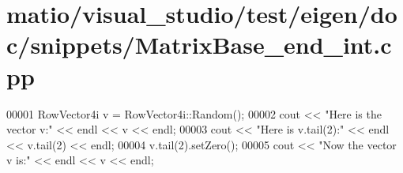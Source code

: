 \hypertarget{matio_2visual__studio_2test_2eigen_2doc_2snippets_2_matrix_base__end__int_8cpp_source}{}\section{matio/visual\+\_\+studio/test/eigen/doc/snippets/\+Matrix\+Base\+\_\+end\+\_\+int.cpp}
\label{matio_2visual__studio_2test_2eigen_2doc_2snippets_2_matrix_base__end__int_8cpp_source}

\begin{DoxyCode}
00001 RowVector4i v = RowVector4i::Random();
00002 cout << \textcolor{stringliteral}{"Here is the vector v:"} << endl << v << endl;
00003 cout << \textcolor{stringliteral}{"Here is v.tail(2):"} << endl << v.tail(2) << endl;
00004 v.tail(2).setZero();
00005 cout << \textcolor{stringliteral}{"Now the vector v is:"} << endl << v << endl;
\end{DoxyCode}
